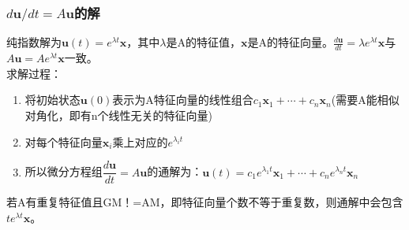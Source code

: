     \subsubsection{$d \boldsymbol{u} / d t=A \boldsymbol{u}$的解}
    纯指数解为$\boldsymbol{u}(t)=e^{\lambda t} \boldsymbol{x}$，其中$\lambda$是A的特征值，$\bm{x}$是A的特征向量。$\frac{d \boldsymbol{u}}{d t}=\lambda e^{\lambda t} \boldsymbol{x}$与$A \boldsymbol{u}=A e^{\lambda t} \boldsymbol{x}$一致。
    \\
    求解过程：
    \begin{enumerate}
        \item 将初始状态$\boldsymbol{u}(0)$表示为A特征向量的线性组合$c_{1} \boldsymbol{x}_{1}+\cdots+c_{n} \boldsymbol{x}_{n}$(需要A能相似对角化，即有n个线性无关的特征向量)
        \item 对每个特征向量$\boldsymbol{x}_{i}$乘上对应的$e^{\lambda_{i} t}$
        \item 所以微分方程组$\dfrac{d \bm{u}}{d t}=A \bm{u}$的通解为：$\bm{u}(t)=c_{1} e^{\lambda_{1} t} \bm{x}_{1}+\cdots+c_{n} e^{\lambda_{n} t} \bm{x}_{n}$
    \end{enumerate}
    若A有重复特征值且GM！=AM，即特征向量个数不等于重复数，则通解中会包含$t e^{\lambda t} \boldsymbol{x}$。

